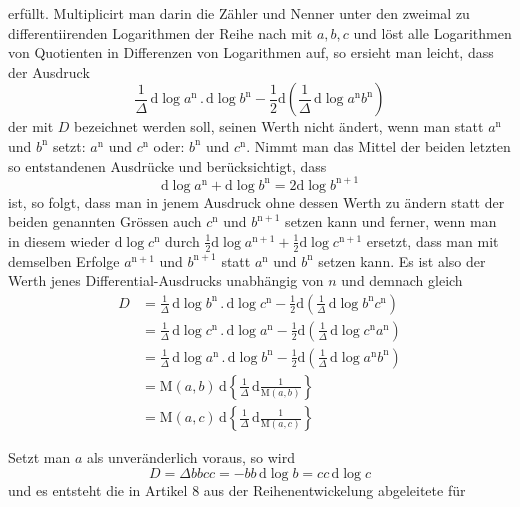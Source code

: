  erfüllt. Multiplicirt man darin die Zähler und Nenner unter den zweimal zu differentiirenden Logarithmen der Reihe nach mit $a,b,c$ und löst alle Logarithmen
von Quotienten in Differenzen von Logarithmen auf, so ersieht man leicht,
dass der Ausdruck
\[
\frac{1}{\Delta}\,\mathrm d\log a^{\mathrm n}\mathbin{.}\mathrm d\log b^{\mathrm n}
-\frac12\mathrm d\left(\frac{1}{\Delta}\,\mathrm d\log a^{\mathrm n}b^{\mathrm n}\right)
\]
der mit $D$ bezeichnet werden soll, seinen Werth nicht ändert, wenn man statt
$a^{\mathrm n}$ und $b^{\mathrm n}$ setzt: $a^{\mathrm n}$ und $c^{\mathrm n}$ oder:
$b^{\mathrm n}$ und $c^{\mathrm n}$. Nimmt man das Mittel der beiden letzten so
entstandenen Ausdrücke und berücksichtigt, dass
\[
\mathrm d\log a^{\mathrm n}+\mathrm d\log b^{\mathrm n}
=2\mathrm d\log b^{\mathrm n+1}
\]
ist, so folgt, dass man in jenem Ausdruck ohne dessen Werth zu ändern statt
der beiden genannten Grössen auch $c^{\mathrm n}$ und $b^{\mathrm n+1}$ setzen kann
und ferner, wenn man in diesem wieder $\mathrm d\log c^{\mathrm n}$ durch
$\frac12\mathrm d\log a^{\mathrm n+1}+\frac12\mathrm d\log c^{\mathrm n+1}$ ersetzt,
dass man mit demselben Erfolge $a^{\mathrm n+1}$ und $b^{\mathrm n+1}$ statt
$a^{\mathrm n}$ und $b^{\mathrm n}$ setzen kann. Es ist also der Werth jenes
Differential-Ausdrucks unabhängig von $n$ und demnach gleich
\[
\begin{aligned}
D&=\displaystyle\frac{1}{\Delta}\,\mathrm d\log b^{\mathrm n}\mathbin{.}\mathrm d\log c^{\mathrm n}
-\frac12\mathrm d\left(\frac{1}{\Delta}\,\mathrm d\log b^{\mathrm n}c^{\mathrm n}\right)\\[6pt]
&=\displaystyle\frac{1}{\Delta}\,\mathrm d\log c^{\mathrm n}\mathbin{.}\mathrm d\log a^{\mathrm n}
-\frac12\mathrm d\left(\frac{1}{\Delta}\,\mathrm d\log c^{\mathrm n}a^{\mathrm n}\right)\\[6pt]
&=\displaystyle\frac{1}{\Delta}\,\mathrm d\log a^{\mathrm n}\mathbin{.}\mathrm d\log b^{\mathrm n}
-\frac12\mathrm d\left(\frac{1}{\Delta}\,\mathrm d\log a^{\mathrm n}b^{\mathrm n}\right)\\[6pt]
&=\displaystyle\mathrm M(a,b)\,\mathrm d\left\{\frac{1}{\Delta}\,\mathrm d\frac{1}{\mathrm M(a,b)}\right\}\\&=\mathrm M(a,c)\,\mathrm d\left\{\frac{1}{\Delta}\,\mathrm d\frac{1}{\mathrm M(a,c)}\right\}
\end{aligned}
\]
\par Setzt man $a$ als unveränderlich voraus, so wird
\[
D=\Delta bbcc=-bb\,\mathrm d\log b=cc\,\mathrm d\log c
\]
und es entsteht die in Artikel 8 aus der Reihenentwickelung abgeleitete für
